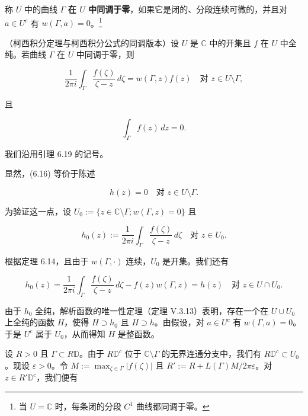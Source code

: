称 $ U $ 中的曲线 $ \Gamma $ \textbf{在 $ U $ 中同调于零}，如果它是闭的、分段连续可微的，并且对 $ a \in U^{c} $ 有 $ w(\Gamma,a) = 0 $。\footnote{当 $ U = \mathbb{C} $ 时，每条闭的分段 $ C^{1} $ 曲线都同调于零。}

\begin{theorem}

（柯西积分定理与柯西积分公式的同调版本）设 $ U $ 是 $ \mathbb{C} $ 中的开集且 $ f $ 在 $ U $ 中全纯。若曲线 $ \Gamma $ 在 $ U $ 中同调于零，则

\begin{equation}
\frac{1}{2\pi i}\int_{\Gamma}\frac{f(\zeta)}{\zeta - z}\,d\zeta = w(\Gamma,z)f(z) \quad \text{对 } z \in U\setminus\Gamma ,\tag{6.16}
\end{equation}

且

\begin{equation}
\int_{\Gamma}f(z)\,dz = 0 .\tag{6.17}
\end{equation}

\proofhead
我们沿用引理 6.19 的记号。

\begin{subitems}
\item

显然，(6.16) 等价于陈述

\begin{equation}
h(z) = 0 \quad \text{对 } z \in U\setminus\Gamma .\tag{6.18}
\end{equation}

为验证这一点，设 $ U_{0} := \{z \in \mathbb{C}\setminus\Gamma ; w(\Gamma,z) = 0\} $ 且

\[
h_{0}(z) := \frac{1}{2\pi i}\int_{\Gamma}\frac{f(\zeta)}{\zeta - z}\,d\zeta \quad \text{对 } z \in U_{0} .
\]

根据定理 6.14，且由于 $ w(\Gamma,\cdot) $ 连续，$ U_{0} $ 是开集。我们还有

\[
h_{0}(z) = \frac{1}{2\pi i}\int_{\Gamma}\frac{f(\zeta)}{\zeta - z}\,d\zeta - f(z)w(\Gamma,z) = h(z) \quad \text{对 } z \in U\cap U_{0} .
\]

由于 $ h_{0} $ 全纯，解析函数的唯一性定理（定理 V.3.13）表明，存在一个在 $ U\cup U_{0} $ 上全纯的函数 $ H $，使得 $ H \supset h_{0} $ 且 $ H \supset h $。由假设，对 $ a \in U^{c} $ 有 $ w(\Gamma,a) = 0 $。于是 $ U^{c} $ 属于 $ U_{0} $，从而得知 $ H $ 是整函数。

\item

设 $ R > 0 $ 且 $ \Gamma \subset R\mathbb{D} $。由于 $ R\mathbb{D}^{c} $ 位于 $ \mathbb{C}\setminus\Gamma $ 的无界连通分支中，我们有 $ R\mathbb{D}^{c} \subset U_{0} $。现设 $ \varepsilon > 0 $。令 $ M := \max_{\zeta\in\Gamma}|f(\zeta)| $ 且 $ R' := R + L(\Gamma)M/2\pi\varepsilon $。对 $ z \in R'\mathbb{D}^{c} $，我们便有


\end{subitems}
\end{theorem}
